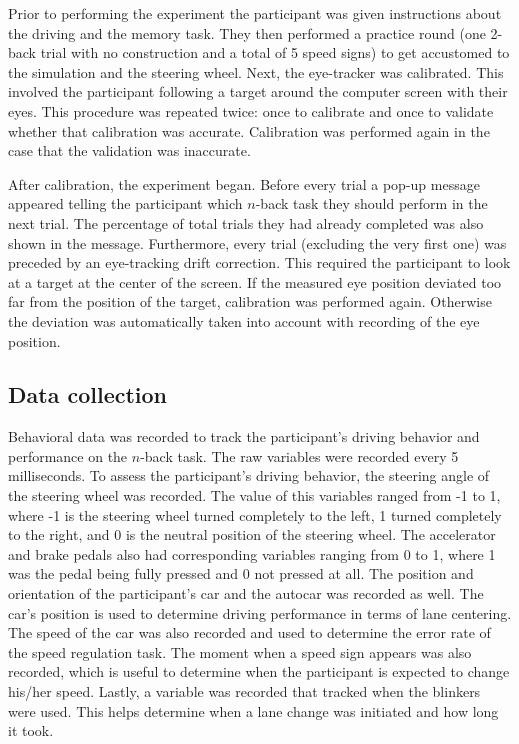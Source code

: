 Prior to performing the experiment the participant was given instructions about the driving and the memory task. 
They then performed a practice round (one 2-back trial with no construction and a total of 5 speed signs) to get accustomed to the simulation and the steering wheel. 
Next, the eye-tracker was calibrated. 
This involved the participant following a target around the computer screen with their eyes. 
This procedure was repeated twice: once to calibrate and once to validate whether that calibration was accurate. 
Calibration was performed again in the case that the validation was inaccurate.

After calibration, the experiment began. 
Before every trial a pop-up message appeared telling the participant which \(n\)-back task they should perform in the next trial. 
The percentage of total trials they had already completed was also shown in the message. 
Furthermore, every trial (excluding the very first one) was preceded by an eye-tracking drift correction. 
This required the participant to look at a target at the center of the screen. 
If the measured eye position deviated too far from the position of the target, calibration was performed again. 
Otherwise the deviation was automatically taken into account with recording of the eye position. 

\subsection{Data collection}
Behavioral data was recorded to track the participant's driving behavior and performance on the \(n\)-back task. 
The raw variables were recorded every 5 milliseconds. 
To assess the participant's driving behavior, the steering angle of the steering wheel was recorded. 
The value of this variables ranged from -1 to 1, where -1 is the steering wheel turned completely to the left, 1 turned completely to the right, and 0 is the neutral position of the steering wheel. 
The accelerator and brake pedals also had corresponding variables ranging from 0 to 1, where 1 was the pedal being fully pressed and 0 not pressed at all. 
The position and orientation of the participant's car and the autocar was recorded as well. 
The car's position is used to determine driving performance in terms of lane centering. 
The speed of the car was also recorded and used to determine the error rate of the speed regulation task. 
The moment when a speed sign appears was also recorded, which is useful to determine when the participant is expected to change his/her speed. 
Lastly, a variable was recorded that tracked when the blinkers were used. 
This helps determine when a lane change was initiated and how long it took. 

